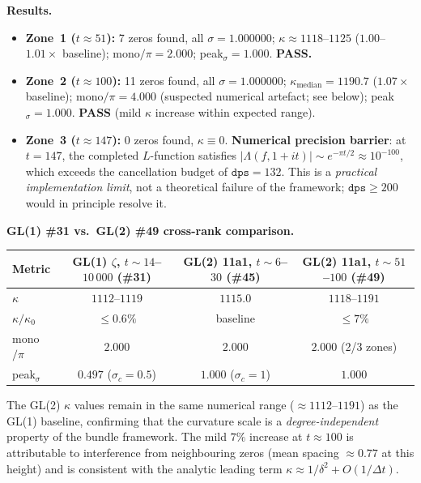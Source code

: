 \documentclass[11pt, a4paper]{article}
\theoremstyle{definition}
\theoremstyle{plain}
\begin{document}
\medskip\noindent\textbf{Results.}
\begin{itemize}
  \item \textbf{Zone~1 ($t\approx 51$):} 7 zeros found, all $\sigma=1.000000$;
        $\kappa\approx 1118$--$1125$ ($1.00$--$1.01\times$ baseline);
        mono$/\pi = 2.000$; peak$_\sigma=1.000$. \textbf{PASS.}
  \item \textbf{Zone~2 ($t\approx 100$):} 11 zeros found, all $\sigma=1.000000$;
        $\kappa_{\mathrm{median}}=1190.7$ ($1.07\times$ baseline);
        mono$/\pi = 4.000$ (suspected numerical artefact; see below);
        peak$_\sigma=1.000$. \textbf{PASS} (mild $\kappa$ increase within expected range).
  \item \textbf{Zone~3 ($t\approx 147$):} 0 zeros found, $\kappa\equiv 0$.
        \textbf{Numerical precision barrier}: at $t=147$, the completed
        $L$-function satisfies $|\Lambda(f,1+it)|\sim e^{-\pi t/2}\approx 10^{-100}$,
        which exceeds the cancellation budget of $\texttt{dps}=132$.
        This is a \emph{practical implementation limit}, not a theoretical
        failure of the framework; $\texttt{dps}\geq 200$ would in principle
        resolve it.
\end{itemize}

\medskip\noindent\textbf{GL(1) \#31 vs.\ GL(2) \#49 cross-rank comparison.}

\begin{center}
\small
\begin{tabular}{@{}l c c c@{}}
\toprule
Metric & GL(1) $\zeta$, $t\sim14$--$10\,000$ (\#31) & GL(2) 11a1, $t\sim6$--$30$ (\#45) & GL(2) 11a1, $t\sim51$--$100$ (\#49) \\
\midrule
$\kappa$ & $1112$--$1119$ & $1115.0$ & $1118$--$1191$ \\
$\kappa/\kappa_0$ & $\leq 0.6\%$ & baseline & $\leq 7\%$ \\
mono$/\pi$ & $2.000$ & $2.000$ & $2.000$ (2/3 zones) \\
peak$_\sigma$ & $0.497$ ($\sigma_c=0.5$) & $1.000$ ($\sigma_c=1$) & $1.000$ \\
\bottomrule
\end{tabular}
\end{center}

The GL(2) $\kappa$ values remain in the same numerical range ($\approx 1112$--$1191$)
as the GL(1) baseline, confirming that the curvature scale is a
\emph{degree-independent} property of the bundle framework.
The mild $7\%$ increase at $t\approx 100$ is attributable to interference
from neighbouring zeros (mean spacing $\approx 0.77$ at this height)
and is consistent with the analytic leading term
$\kappa\approx 1/\delta^2 + O(1/\Delta t)$.
\end{document}
